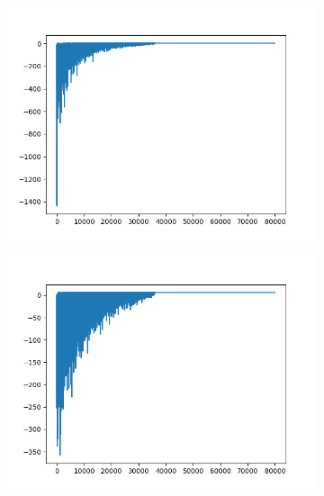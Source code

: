 \begin{figure}[H]
\begin{subfigure}{.25\textwidth}
		\includegraphics[width=\textwidth]{img/train/matrice_2-11_21_33.png}
	\end{subfigure}%
		\begin{subfigure}{.25\textwidth}
		\includegraphics[width=\textwidth]{img/train/matrice_3-11_22_11.png}
	\end{subfigure}%


\end{figure}
